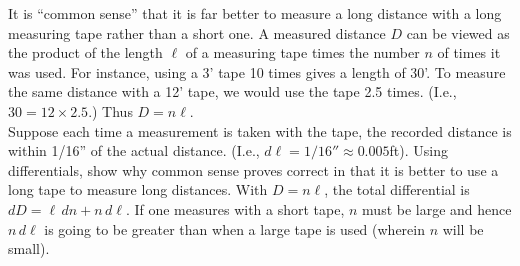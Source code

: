 {It is ``common sense'' that it is far better to measure a long distance with a long measuring tape rather than a short one. A measured distance $D$ can be viewed as the product of the length $\ell$ of a measuring tape times the number $n$ of times it was used. For instance, using a 3' tape 10 times gives a length of 30'. To measure the same distance with a 12' tape, we would use the tape 2.5 times. (I.e., $30=12\times 2.5$.) Thus $D = n\ell$.\\

Suppose each time a measurement is taken with the tape, the recorded distance is within 1/16'' of the actual distance. (I.e., $d\ell = 1/16'' \approx 0.005$ft). Using differentials, show why common sense proves correct in that it is better to use a long tape to measure long distances.
}
{With $D = n\ell$, the total differential is $dD = \ell\, dn+ n\,d\ell.$ If one measures with a short tape, $n$ must be large and hence $n\,d\ell$ is going to be greater than when a large tape is used (wherein $n$ will be small).
}